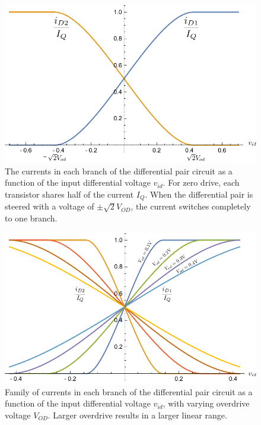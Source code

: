 \begin{figure}[H]
\centering
\includegraphics[scale=0.825]{mosdiffamp_id}
\caption{The currents in each branch of the differential pair circuit as a function of the input differential voltage $v_{id}$.  For zero drive, each transistor shares half of the current $I_Q$.  When the differential pair is steered with a voltage of $\pm \sqrt{2} V_{OD}$, the current switches completely to one branch.}
\label{fig:mosdiffamp_id}
\end{figure}
\begin{figure}[H]
\centering
\includegraphics[scale=0.825]{mosdiffamp_id_od}
\caption{Family of currents in each branch of the differential pair circuit as a function of the input differential voltage $v_{id}$, with varying overdrive voltage $V_{OD}$.  Larger overdrive results in a larger linear range.}
\label{fig:mosdiffamp_id_od}
\end{figure}
